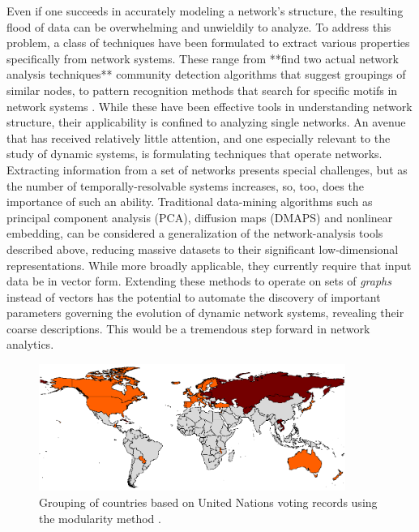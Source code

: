 \documentclass[11pt]{article}
\begin{document}
Even if one succeeds in accurately modeling a network's structure, the resulting flood of data can be overwhelming and unwieldily to analyze. To address this problem, a class of techniques have been formulated to extract various properties specifically from network systems. These range from **find two actual network analysis techniques** community detection algorithms that suggest groupings of similar nodes, to pattern recognition methods that search for specific motifs in network systems \cite{Zager2008} \cite{Kleinberg1999} \cite{Newman2004} \cite{neuralnetwork pattern recog}. While these have been effective tools in understanding network structure, their applicability is confined to analyzing single networks. An avenue that has received relatively little attention, and one especially relevant to the study of dynamic systems, is formulating techniques that operate  networks. Extracting information from a set of networks presents special challenges, but as the number of temporally-resolvable systems increases, so, too, does the importance of such an ability. Traditional data-mining algorithms such as principal component analysis (PCA), diffusion maps (DMAPS) and nonlinear embedding, can be considered a generalization of the network-analysis tools described above, reducing massive datasets to their significant low-dimensional representations. While more broadly applicable, they currently require that input data be in vector form. Extending these methods to operate on sets of \textit{graphs} instead of vectors has the potential to automate the discovery of important parameters governing the evolution of dynamic network systems, revealing their coarse descriptions. This would be a tremendous step forward in network analytics.\vspace{1mm}\\
\begin{figure}[h!]
  \centering
  \includegraphics[width=10cm]{unCommunityDetection}
  \caption{Grouping of countries based on United Nations voting records using the modularity method \cite{porter}.}
  \label{fig:un}
\end{figure}
\end{document}
